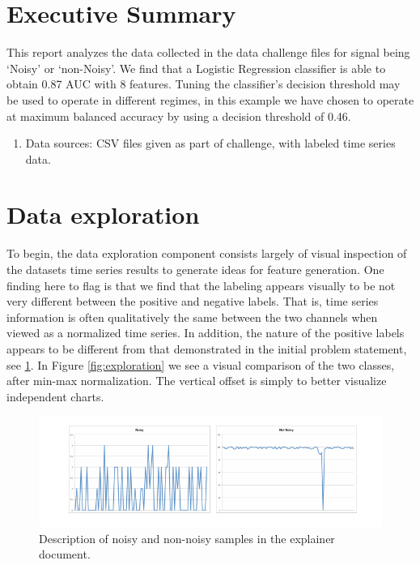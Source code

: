 \documentclass[12pt]{article}
\begin{document}
\section{Executive Summary}
This report analyzes the data collected in the data challenge files for signal being `Noisy' or `non-Noisy'. We find that a Logistic Regression classifier is able to obtain 0.87 AUC with 8 features. Tuning the classifier's decision threshold may be used to operate in different regimes, in this example we have chosen to operate at maximum balanced accuracy by using a decision threshold of 0.46.

\begin{enumerate}
\item{Data sources: CSV files given as part of challenge, with labeled time series data. }
\end{enumerate}


\section{Data exploration}
To begin, the data exploration component consists largely of visual inspection of the datasets time series results to generate ideas for feature generation. One finding here to flag is that we find that the labeling appears visually to be not very different between the positive and negative labels. That is, time series information is often qualitatively the same between the two channels when viewed as a normalized time series. In addition, the nature of the positive labels appears to be different from that demonstrated in the initial problem statement, see \ref{fig:spikes}. In Figure \ref{fig:exploration} we see a visual comparison of the two classes, after min-max normalization. The vertical offset is simply to better visualize independent charts. 

\clearpage

\begin{figure}
\centering
\includegraphics[width=1\textwidth]{spikes.png}
\caption{Description of noisy and non-noisy samples in the explainer document. }
\label{fig:spikes}
\end{figure}
\end{document}
